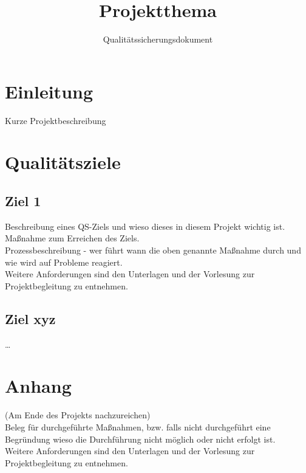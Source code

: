 \documentclass[accentcolor=tud9c,12pt,paper=a4]{tudreport}
\title{Projektthema}
\subtitle{Qualitätssicherungsdokument}
\begin{document}
	\maketitle
	\tableofcontents

	\chapter{Einleitung}
		Kurze Projektbeschreibung

	\chapter{Qualitätsziele}
        \section{Ziel 1}

		Beschreibung eines QS-Ziels und wieso dieses in diesem Projekt wichtig ist.\\
		Maßnahme zum Erreichen des Ziels.\\
		Prozessbeschreibung - wer führt wann die oben genannte Maßnahme durch und wie wird auf Probleme reagiert.\\
		Weitere Anforderungen sind den Unterlagen und der Vorlesung zur Projektbegleitung zu entnehmen.

        \section{Ziel xyz}
	        \ldots


\appendix
	\chapter{Anhang}
		(Am Ende des Projekts nachzureichen)\\
		Beleg für durchgeführte Maßnahmen, bzw. falls nicht durchgeführt eine Begründung wieso die Durchführung nicht möglich oder nicht erfolgt ist. \\
		Weitere Anforderungen sind den Unterlagen und der Vorlesung zur Projektbegleitung zu entnehmen.
\end{document}
